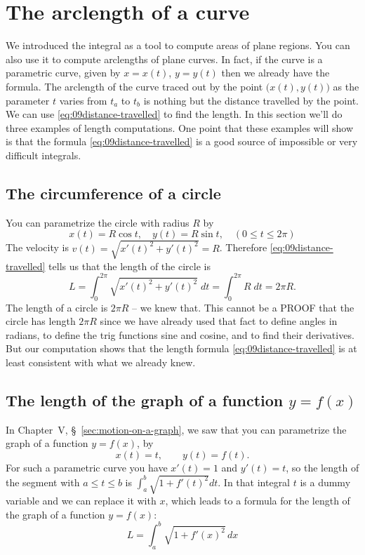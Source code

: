 \section{The arclength of a curve} %
We introduced the integral as a tool to compute areas of plane regions.  You can
also use it to compute arclengths of plane curves.  In fact, if the curve is a
parametric curve, given by $x=x(t)$, $y=y(t)$ then we already have the formula.
The arclength of the curve traced out by the point $\bigl(x(t), y(t)\bigr)$ as the
parameter $t$ varies from $t_a$ to $t_b$ is nothing but the distance travelled
by the point.  We can use \eqref{eq:09distance-travelled} to find the length.
In this section we'll do three examples of length computations.  One point that
these examples will show is that the formula \eqref{eq:09distance-travelled}
is a good source of impossible or very difficult integrals.


\subsection{The circumference of a circle} %
You can parametrize the circle with radius $R$ by
\[
x(t) = R\cos t, \quad y(t)=R\sin t,\quad (0\leq t\leq 2\pi)
\]
The velocity is $v(t) = \sqrt{x'(t)^2+y'(t)^2} = R$.
Therefore \eqref{eq:09distance-travelled} tells us that the length of the
circle is
\marginpar{\footnotesize }%
\[
L = \int_0^{2\pi}\sqrt{x'(t)^2+y'(t)^2}\;dt = \int_0^{2\pi} R\;dt = 2\pi R.
\]
The length of a circle is $2\pi R$ -- we knew that.
This cannot be a PROOF that the circle has length $2\pi R$ since we have
already used that fact to define angles in radians, to define the trig functions
sine and cosine, and to find their derivatives.  But our computation shows that
the length formula \eqref{eq:09distance-travelled} is at least consistent with
what we already knew.

\subsection{The length of the graph of a function $y=f(x)$} %
In Chapter~V, \S~\ref{sec:motion-on-a-graph}, we saw that you can parametrize
the graph of a function $y=f(x)$, by
\[
  x(t) = t, \qquad y(t) = f(t).
\]%
\marginpar{\def\svgwidth{90pt}%
\footnotesize\sffamily%

}%
For such a parametric curve you have $x'(t) = 1$ and $y'(t) = t$, so the length
of the segment with $a\leq t\leq b$ is $\int_a^b \sqrt{1+f'(t)^2} dt$.  In that
integral $t$ is a dummy variable and we can replace it with $x$, which leads to
a formula for the length of the graph of a function $y=f(x)$:
\begin{equation}
  L = \int_a^b \sqrt{1+f'(x)^2}\, dx
  \label{eq:09length-of-graph-of-f}
\end{equation}

